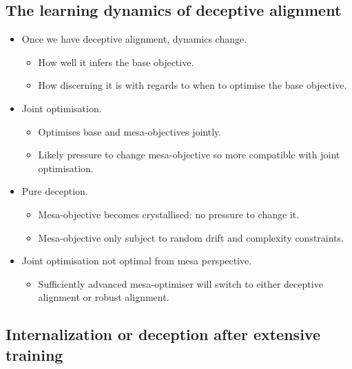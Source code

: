 \subsection{The learning dynamics of deceptive alignment}

\begin{itemize}
    \item Once we have deceptive alignment, dynamics change.
    \begin{itemize}
        \item How well it infers the base objective.
        \item How discerning it is with regards to when to optimise the base objective.
    \end{itemize}
    \item Joint optimisation.
    \begin{itemize}
        \item Optimises base and mesa-objectives jointly.
        \item Likely pressure to change mesa-objective so more compatible with joint optimisation.
    \end{itemize}
    \item Pure deception.
    \begin{itemize}
        \item Mesa-objective becomes crystallised: no pressure to change it.
        \item Mesa-objective only subject to random drift and complexity constraints.
    \end{itemize}
    \item Joint optimisation not optimal from mesa perspective.
    \begin{itemize}
        \item Sufficiently advanced mesa-optimiser will switch to either deceptive alignment or robust alignment.
    \end{itemize}
\end{itemize}


\subsection{Internalization or deception after extensive training}

